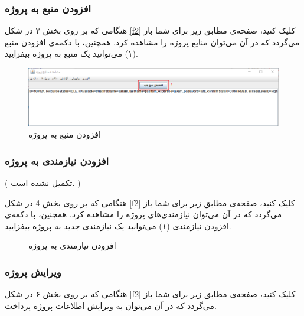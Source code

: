 \subsubsection{افزودن منبع به پروژه}
هنگامی که بر روی بخش ۳ در شکل
\ref{f2}
کلیک کنید، صفحه‌ی مطابق زیر برای شما باز می‌گردد که در آن می‌توان منابع پروژه را مشاهده کرد. همچنین، با دکمه‌ی افزودن منبع (۱) می‌توانید یک منبع به پروژه بیفزایید.

\begin{figure}[H]
	\centering
	\includegraphics[scale=0.5]{img/manual/addResToProject}
	\caption{افزودن منبع به پروژه}
	\label{f4}
\end{figure}	


\subsubsection{افزودن نیازمندی به پروژه}
({\color{red}  تکمیل نشده است. })

هنگامی که بر روی بخش 4 در شکل
\ref{f2}
کلیک کنید، صفحه‌ی مطابق زیر برای شما باز می‌گردد که در آن می‌توان نیازمندی‌های پروژه را مشاهده کرد. همچنین، با دکمه‌ی افزودن نیازمندی (۱) می‌توانید یک نیازمندی جدید به پروژه بیفزایید.

\begin{figure}[H]
	\centering
	\caption{افزودن نیازمندی به پروژه}
	\label{f5}
\end{figure}


\subsubsection{ویرایش پروژه}
هنگامی که بر روی بخش ۶ در شکل
\ref{f2}
کلیک کنید، صفحه‌ی مطابق زیر برای شما باز می‌گردد که در آن می‌توان  به ویرایش اطلاعات پروژه پرداخت.

